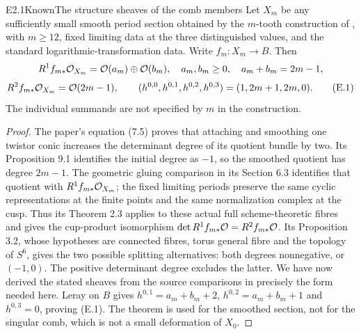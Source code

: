 \begin{claim}{E2.1}{Known}{The structure sheaves of the comb members}
Let $X_m$ be any sufficiently small smooth period section obtained by
the $m$-tooth construction of
\citet[Theorem 1.1]{ViaclovskyCombs2026}, with
$m\ge12$, fixed limiting data at the three distinguished values, and
the standard logarithmic-transformation data. Write
$f_m:X_m\to B$. Then
\[
 R^1f_{m*}\mathcal O_{X_m}=\mathcal O(a_m)\oplus\mathcal O(b_m),\quad
 a_m,b_m\ge0,\quad a_m+b_m=2m-1,
\]
\[
 R^2f_{m*}\mathcal O_{X_m}=\mathcal O(2m-1),\qquad
 (h^{0,0},h^{0,1},h^{0,2},h^{0,3})=(1,2m+1,2m,0).      \tag{E.1}
\]
The individual summands are not specified by $m$ in the construction.
\end{claim}
\begin{proof}
The paper's equation (7.5) proves that attaching and smoothing one
twistor conic increases the determinant degree of its quotient bundle
by two. Its Proposition 9.1 identifies the initial degree as $-1$,
so the smoothed quotient has degree $2m-1$. The geometric gluing
comparison in its Section 6.3 identifies that quotient with
$R^1f_{m*}\mathcal O_{X_m}$; the fixed limiting periods preserve the same
cyclic representations at the finite points and the same
normalization complex at the cusp. Thus its Theorem 2.3 applies to
these actual full scheme-theoretic fibres and gives the cup-product
isomorphism $\det R^1f_{m*}\mathcal O=R^2f_{m*}\mathcal O$.
Its Proposition 3.2, whose hypotheses are connected fibres, torus
general fibre and the topology of $S^6$, gives the two possible
splitting alternatives: both degrees nonnegative, or $(-1,0)$.
The positive determinant degree excludes the latter. We have now
derived the stated sheaves from the source comparisons in precisely
the form needed here. Leray on $B$ gives $h^{0,1}=a_m+b_m+2$,
$h^{0,2}=a_m+b_m+1$ and $h^{0,3}=0$, proving (E.1).
The theorem is used for the smoothed section, not for the singular
comb, which is not a small deformation of $X_0$.
\end{proof}

